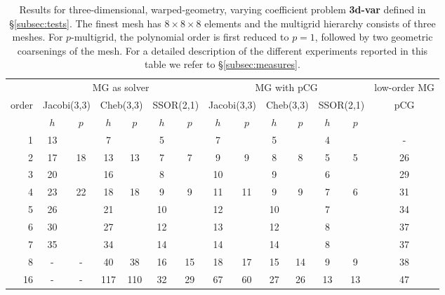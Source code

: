 \documentclass[smallcondensed,final]{svjour3}     %
\begin{document}
\begin{table}
  \caption{\label{tab:3d-fan} Results for three-dimensional,
    warped-geometry, varying coefficient problem {\bf 3d-var} defined
    in \S\ref{subsec:tests}.     The finest
    mesh has $8\times 8\times 8$ elements and the multigrid hierarchy
    consists of three meshes.  For $p$-multigrid, the
    polynomial order is first reduced to $p=1$, followed by two
    geometric coarsenings of the mesh.
    For a detailed description of the
    different experiments reported in this table we refer to
    \S\ref{subsec:measures}.}  \centering
	  \begin{tabular}{|r|c c|c c|c c||c c|c c|c c||c|} 
	    \hline
	    & \multicolumn{6}{c||}{MG as solver} &
            \multicolumn{6}{c||}{MG with pCG} &
            \!\!low-order MG\!\! \\
	    \cline{2-13}
	    \!\!\! order \!\!\!\! &  \multicolumn{2}{c|}{\!\!\scriptsize  Jacobi(3,3)\!\!} &  \multicolumn{2}{c|}{\!\!\scriptsize Cheb(3,3)\!\!} & \multicolumn{2}{c||}{\!\!\scriptsize  SSOR(2,1)\!\!} & \multicolumn{2}{c|}{\!\!\scriptsize Jacobi(3,3)\!\!} &  \multicolumn{2}{c|}{\!\!\scriptsize Cheb(3,3)\!\!} & \multicolumn{2}{c||}{\!\!\scriptsize SSOR(2,1)\!\!} & pCG \\
	\hline
	 & $h$ & $p$ & $h$ & $p$& $h$ & $p$& $h$ & $p$& $h$ & $p$& $h$ & $p$& ~ \\
	 \cline{2-13}
1 & 13 & & 7 & & 5 & & 7 & & 5 & & 4 & & -  \\
2 & 17 & 18 & 13 & 13 & 7 & 7 & 9 & 9 & 8 & 8 & 5 & 5 & 26 \\
3 & 20 & & 16 & & 8 & & 10 & & 9 & & 6 & & 29  \\
4 & 23 & 22 & 18 & 18 & 9 & 9 & 11 & 11 & 9 & 9 & 7 & 6 & 31 \\
5 & 26 & & 21 & & 10 & & 12 & & 10 & & 7 & & 34  \\
6 & 30 & & 27 & & 12 & & 13 & & 12 & & 8 & & 37 \\
7 & 35 & & 34 & & 14 & & 14 & & 14 & & 8 & & 37  \\
8 & - & - & 40 & 38 & 16 & 15 & 18 & 17 & 15 & 14 & 9 & 9 & 38 \\
16 & - & - & 117 & 110 & 32 & 29 & 67 & 60 & 27 & 26 & 13 & 13 & 47\\
\hline
  \end{tabular}
\end{table}
\end{document}
